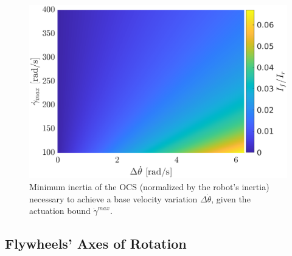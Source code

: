\documentclass[sensors,article,accept,pdftex,moreauthors]{Definitions/mdpi}
\begin{document}
\begin{figure}[H]%
	 
	\includegraphics[width=.8\linewidth]{figures/lowerbound2.eps}
	\caption{\small Minimum inertia of the OCS (normalized by the robot's inertia) necessary to achieve a base velocity variation $\Delta \dot{\theta}$, given the actuation bound $\dot \gamma^{max}$.}
	\label{fig:inertia_limits}
\end{figure}



\subsection{Flywheels' Axes of Rotation}
\label{subseq:flywheel_axes}
\end{document}
